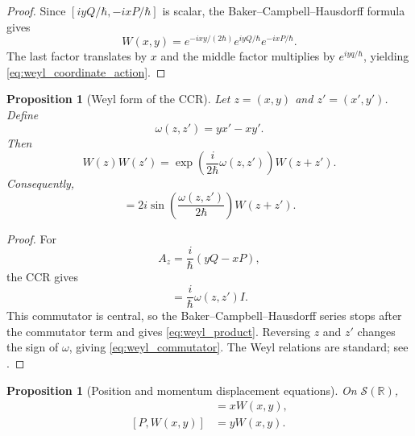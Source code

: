 \documentclass[11pt]{amsart}
\numberwithin{equation}{section}
\theoremstyle{plain}
\newtheorem{proposition}[theorem]{Proposition}
\theoremstyle{definition}
\theoremstyle{remark}
\newcommand{\R}{\mathbb{R}}
\newcommand{\Sch}{\mathcal{S}}
\begin{document}
\begin{proof}
Since $[iyQ/\hbar,-ixP/\hbar]$ is scalar, the Baker--Campbell--Hausdorff
formula gives
\begin{equation}
W(x,y)
=
e^{-ixy/(2\hbar)}e^{iyQ/\hbar}e^{-ixP/\hbar}.
\label{eq:weyl_BCH_factorization}
\end{equation}
The last factor translates by $x$ and the middle factor multiplies by
$e^{iyq/\hbar}$, yielding \eqref{eq:weyl_coordinate_action}.
\end{proof}

\begin{proposition}[Weyl form of the CCR]
\label{prop:weyl_relation}
Let $z=(x,y)$ and $z'=(x',y')$.  Define
\begin{equation}
\omega(z,z')=yx'-xy'.
\label{eq:symplectic_form}
\end{equation}
Then
\begin{equation}
W(z)W(z')
=
\exp\!\left(\frac{i}{2\hbar}\omega(z,z')\right)
W(z+z').
\label{eq:weyl_product}
\end{equation}
Consequently,
\begin{equation}
[W(z),W(z')]
=
2i\sin\!\left(\frac{\omega(z,z')}{2\hbar}\right)W(z+z').
\label{eq:weyl_commutator}
\end{equation}
\end{proposition}

\begin{proof}
For
\begin{equation}
A_z=\frac{i}{\hbar}(yQ-xP),
\label{eq:Az_definition}
\end{equation}
the CCR gives
\begin{equation}
[A_z,A_{z'}]
=
\frac{i}{\hbar}\omega(z,z')I.
\label{eq:Az_commutator}
\end{equation}
This commutator is central, so the Baker--Campbell--Hausdorff series stops
after the commutator term and gives \eqref{eq:weyl_product}.  Reversing $z$
and $z'$ changes the sign of $\omega$, giving \eqref{eq:weyl_commutator}.
The Weyl relations are standard; see \cite{Folland1989}.
\end{proof}

\begin{proposition}[Position and momentum displacement equations]
\label{prop:weyl_QP_commutators}
On $\Sch(\R)$,
\begin{align}
[Q,W(x,y)]
&=xW(x,y),
\label{eq:Q_W_commutator}\\
[P,W(x,y)]
&=yW(x,y).
\label{eq:P_W_commutator}
\end{align}
\end{proposition}
\end{document}
